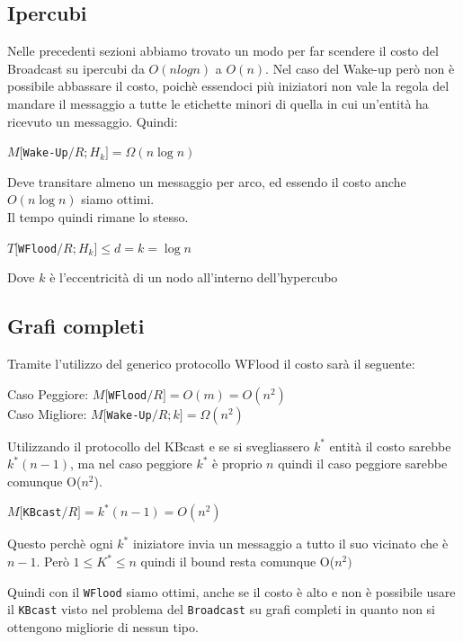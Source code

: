 \subsection{Ipercubi}
Nelle precedenti sezioni abbiamo trovato un modo per far scendere il costo del Broadcast su ipercubi da $O(nlogn)$ a $O(n)$. Nel caso del Wake-up però non è possibile abbassare il costo, poichè essendoci più iniziatori non vale la regola del mandare il messaggio a tutte le etichette minori di quella in cui un'entità ha ricevuto un messaggio. Quindi:
\begin{center}
  $M[$\texttt{Wake-Up}$/R;H_k] = \Omega(n \log n)$ \\
\end{center}
Deve transitare almeno un messaggio per arco, ed essendo il costo anche $O(n \log n)$ siamo ottimi.\\
Il tempo quindi rimane lo stesso.
\begin{center}
     $T[$\texttt{WFlood}$/R;H_k] \leq d = k = \log n$ \\
\end{center}
Dove $k$ è l'eccentricità di un nodo all'interno dell'hypercubo
    
\subsection{Grafi completi}
Tramite l'utilizzo del generico protocollo WFlood il costo sarà il seguente:
\begin{center}
  Caso Peggiore: $M[$\texttt{WFlood}$/R] = O(m) = O(n^2)$ \\
  Caso Migliore: $M[$\texttt{Wake-Up}$/R;k] = \Omega(n^2)$
\end{center}
Utilizzando il protocollo del KBcast e se si svegliassero $k^*$ entità il costo sarebbe $k^*(n-1)$, ma nel caso peggiore $k^*$ è proprio $n$ quindi il caso peggiore sarebbe comunque O($n^2$). 
\begin{center}
  $M[$\texttt{KBcast}$/R] = k^*(n-1) = O(n^2)$
\end{center}
Questo perchè ogni $k^*$ iniziatore invia un messaggio a tutto il suo vicinato che è $n-1$. Però $1\leq K^* \leq n$ quindi il bound resta comunque O($n^2)$

Quindi con il \texttt{WFlood} siamo ottimi, anche se il costo è alto e non è possibile usare il \texttt{KBcast} visto nel problema del \texttt{Broadcast} su grafi completi in quanto non si ottengono migliorie di nessun tipo.

